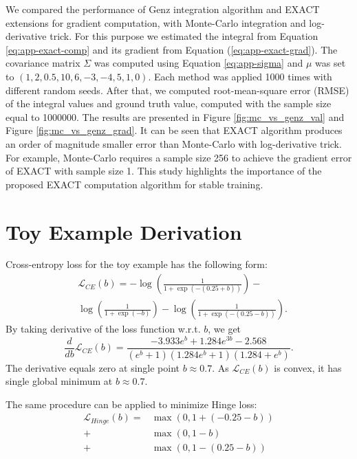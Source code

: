 \documentclass[nohyperref]{article}
\theoremstyle{plain}
\theoremstyle{definition}
\theoremstyle{remark}
\begin{document}
We compared the performance of Genz integration algorithm \cite{genz1992numerical} and EXACT extensions for gradient computation, with Monte-Carlo integration and log-derivative trick. For this purpose we estimated the integral from Equation \ref{eq:app-exact-comp} and its gradient from Equation (\ref{eq:app-exact-grad}). The covariance matrix $\Sigma$ was computed using Equation \ref{eq:app-sigma} and $\mu$ was set to $(1, 2, 0.5, 10, 6, -3, -4, 5, 1, 0)$. Each method was applied 1000 times with different random seeds. After that, we computed root-mean-square error (RMSE) of the integral values and ground truth value, computed with the sample size equal to 1000000.
The results are presented in Figure \ref{fig:mc_vs_genz_val} and Figure \ref{fig:mc_vs_genz_grad}. It can be seen that EXACT algorithm produces an order of magnitude smaller error than Monte-Carlo with log-derivative trick. For example, Monte-Carlo requires a sample size 256 to achieve the gradient error of EXACT with sample size 1. This study highlights the importance of the proposed EXACT computation algorithm for stable training.



\section{Toy Example Derivation}\label{app:toy}
Cross-entropy loss for the toy example has the following form:
\begin{equation}
\begin{aligned}
&\mathcal{L}_{CE}(b) = -\log \left(\frac{1}{1+\exp (-(0.25+b))}\right)- \\
&\log \left(\frac{1}{1+\exp (-b)}\right)-\log \left(\frac{1}{1+\exp (-(0.25-b))}\right).
\end{aligned}
\end{equation}
By taking derivative of the loss function w.r.t. $b$, we get
\begin{equation}
\frac{d}{db}\mathcal{L}_{CE}(b) = \frac{-3.933 e^{b}+1.284 e^{3 b}-2.568}{\left(e^{b}+1\right)\left(1.284 e^{b}+1\right)\left(1.284+e^{b}\right)}.
\end{equation}
The derivative equals zero at single point $b \approx 0.7$. As $\mathcal{L}_{CE}(b)$ is convex, it has single global minimum at $b \approx 0.7$.

The same procedure can be applied to minimize Hinge loss:
\begin{equation}
\begin{aligned}
\mathcal{L}_{Hinge}(b) = &\max (0,1+(-0.25-b))\\
+&\max (0,1-b)\\
+&\max (0,1-(0.25-b))
\end{aligned}
\end{equation}
\end{document}
